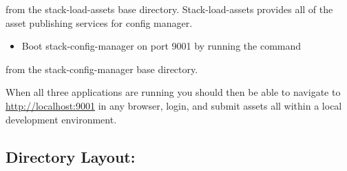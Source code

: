 \begin{Shaded}
\begin{Highlighting}[]
\end{Highlighting}
\end{Shaded}

from the stack-load-assets base directory. Stack-load-assets provides
all of the asset publishing services for config manager.

\begin{itemize}
\tightlist
\item
  Boot stack-config-manager on port 9001 by running the command
\end{itemize}

\begin{Shaded}
\begin{Highlighting}[]
\end{Highlighting}
\end{Shaded}

from the stack-config-manager base directory.

When all three applications are running you should then be able to
navigate to \href{http://localhost:9001}{http://localhost:9001} in any
browser, login, and submit assets all within a local development
environment.

\hypertarget{directory-layout}{%
\subsection{Directory Layout:}\label{directory-layout}}

